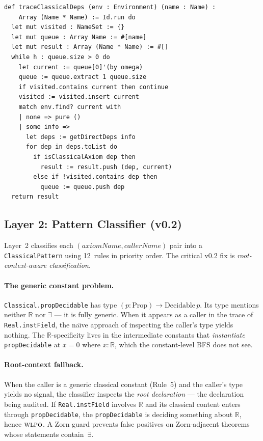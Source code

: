 \documentclass[12pt, a4paper]{article}
\theoremstyle{plain}
\theoremstyle{definition}
\theoremstyle{remark}
\newcommand{\WLPO}{\textsc{wlpo}}
\begin{document}
\begin{lstlisting}[caption={Layer 1: BFS trace (simplified).}]
def traceClassicalDeps (env : Environment) (name : Name) :
    Array (Name * Name) := Id.run do
  let mut visited : NameSet := {}
  let mut queue : Array Name := #[name]
  let mut result : Array (Name * Name) := #[]
  while h : queue.size > 0 do
    let current := queue[0]'(by omega)
    queue := queue.extract 1 queue.size
    if visited.contains current then continue
    visited := visited.insert current
    match env.find? current with
    | none => pure ()
    | some info =>
      let deps := getDirectDeps info
      for dep in deps.toList do
        if isClassicalAxiom dep then
          result := result.push (dep, current)
        else if !visited.contains dep then
          queue := queue.push dep
  return result
\end{lstlisting}

\subsection{Layer 2: Pattern Classifier (v0.2)}

Layer~2 classifies each $(axiomName, callerName)$ pair into a
\texttt{ClassicalPattern} using 12~rules in priority order.
The critical v0.2 fix is \emph{root-context-aware classification}.

\paragraph{The generic constant problem.}
\texttt{Classical.propDecidable} has type
$(p : \mathrm{Prop}) \to \mathrm{Decidable}\,p$.  Its type
mentions neither $\mathbb{R}$ nor $\exists$ --- it is fully generic.
When it appears as a caller in the trace of \texttt{Real.instField},
the na\"{\i}ve approach of inspecting the caller's type yields
nothing.  The $\mathbb{R}$-specificity lives in the intermediate
constants that \emph{instantiate} \texttt{propDecidable} at
$x = 0$ where $x : \mathbb{R}$, which the constant-level BFS
does not see.

\paragraph{Root-context fallback.}
When the caller is a generic classical constant (Rule~5) and
the caller's type yields no signal, the classifier inspects the
\emph{root declaration} --- the declaration being audited.  If
\texttt{Real.instField} involves $\mathbb{R}$ and its classical
content enters through \texttt{propDecidable}, the \texttt{propDecidable}
is deciding something about $\mathbb{R}$, hence $\WLPO$.  A Zorn guard
prevents false positives on Zorn-adjacent theorems whose statements
contain~$\exists$.
\end{document}
